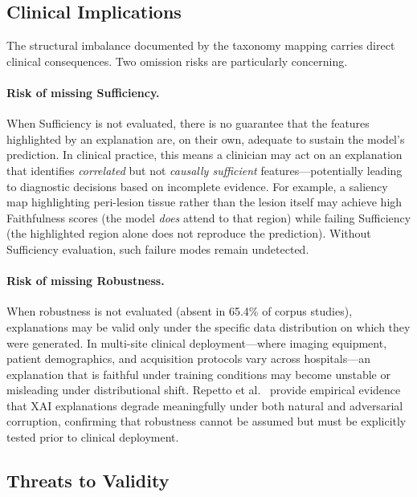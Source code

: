 \subsection{Clinical Implications}

The structural imbalance documented by the taxonomy mapping carries direct clinical consequences. Two omission risks are particularly concerning.

\paragraph{Risk of missing Sufficiency.}
When Sufficiency is not evaluated, there is no guarantee that the features highlighted by an explanation are, on their own, adequate to sustain the model's prediction. In clinical practice, this means a clinician may act on an explanation that identifies \emph{correlated} but not \emph{causally sufficient} features---potentially leading to diagnostic decisions based on incomplete evidence. For example, a saliency map highlighting peri-lesion tissue rather than the lesion itself may achieve high Faithfulness scores (the model \emph{does} attend to that region) while failing Sufficiency (the highlighted region alone does not reproduce the prediction). Without Sufficiency evaluation, such failure modes remain undetected.

\paragraph{Risk of missing Robustness.}
When robustness is not evaluated (absent in 65.4\% of corpus studies), explanations may be valid only under the specific data distribution on which they were generated. In multi-site clinical deployment---where imaging equipment, patient demographics, and acquisition protocols vary across hospitals---an explanation that is faithful under training conditions may become unstable or misleading under distributional shift. Repetto et al.~\cite{Repetto2025EvaluatingTR} provide empirical evidence that XAI explanations degrade meaningfully under both natural and adversarial corruption, confirming that robustness cannot be assumed but must be explicitly tested prior to clinical deployment.

\subsection{Threats to Validity}

